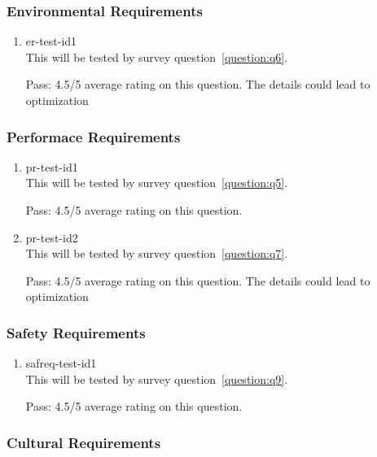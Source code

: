\documentclass[12pt, titlepage]{article}
\begin{document}
\subsubsection{Environmental Requirements}

\begin{enumerate}

\item{er-test-id1\\}
This will be tested by survey question~\ref{question:q6}.

Pass: 4.5/5 average rating on this question. The details could lead to optimization
\end{enumerate}

\subsubsection{Performace Requirements}

\begin{enumerate}

\item{pr-test-id1\\}
This will be tested by survey question~\ref{question:q5}.

Pass: 4.5/5 average rating on this question.
\item{pr-test-id2\\}
This will be tested by survey question~\ref{question:q7}.

Pass: 4.5/5 average rating on this question. The details could lead to optimization
\end{enumerate}

\subsubsection{Safety Requirements}

\begin{enumerate}

\item{safreq-test-id1\\}
This will be tested by survey question~\ref{question:q9}.

Pass: 4.5/5 average rating on this question.
\end{enumerate}

\subsubsection{Cultural Requirements}
\end{document}
